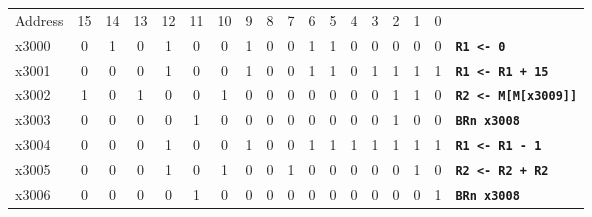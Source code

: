 \documentclass{patt}
\begin{document}
\setcounter{figure}{10}
\begin{figure}
\noindent\small
\hspace*{-8pc}\begin{minipage}{36pc}
\begin{center}
\renewcommand{\tabcolsep}{6pt}%
\begin{tabular}{@{}l c c c c c c c c c c c c c c c c l}
Address & 15 & 14 & 13 & \hfill{12} & 11 & 10 & 9 & 8 & 7 & 6 & 5 & 4 & 3  & 2 & 1 & 0 \\
\cline{2-17}
x3000 & \multicolumn{1}{|c}{0} & 1 & 0 & \multicolumn{1}{c|}{1} & 0 & 0 & \multicolumn{1}{c|}{1} & 0 & 0 & \multicolumn{1}{c|}{1} & \multicolumn{1}{c|}{1} & 0 & 0 & 0 & 0 & \multicolumn{1}{c|}{0} & \multicolumn{1}{l}{\tt\bfseries R1 <- 0}\\
\cline{2-17}
x3001 & \multicolumn{1}{|c}{0} & 0 & 0 & \multicolumn{1}{c|}{1} & 0 & 0 & \multicolumn{1}{c|}{1} & 0 & 0 & \multicolumn{1}{c|}{1} & \multicolumn{1}{c|}{1} & 0 & 1 & 1 & 1 & \multicolumn{1}{c|}{1} & \multicolumn{1}{l}{\tt\bfseries R1 <- R1 + 15}\\
\cline{2-17}
x3002 & \multicolumn{1}{|c}{1} & 0 & 1 & \multicolumn{1}{c|}{0} & 0 & 1 & \multicolumn{1}{c|}{0} & 0 & 0 & 0 & 0 & 0 & 0 & 1 & 1 & \multicolumn{1}{c|}{0} & \multicolumn{1}{l}{\tt\bfseries R2 <- M[M[x3009]]}\\
\cline{2-17}
x3003 & \multicolumn{1}{|c}{0} & 0 & 0 & \multicolumn{1}{c|}{0} & 1 & 0 & \multicolumn{1}{c|}{0} & 0 & 0 & 0 & 0 & 0 & 0 & 1 & 0 & \multicolumn{1}{c|}{0} & \multicolumn{1}{l}{\tt\bfseries BRn x3008}\\
\cline{2-17}
x3004 & \multicolumn{1}{|c}{0} & 0 & 0 & \multicolumn{1}{c|}{1} & 0 & 0 & \multicolumn{1}{c|}{1} & 0 & 0 & \multicolumn{1}{c|}{1} & \multicolumn{1}{c|}{1} & 1 & 1 & 1 & 1 & \multicolumn{1}{c|}{1} & \multicolumn{1}{l}{\tt\bfseries R1 <- R1 - 1}\\
\cline{2-17}
x3005 & \multicolumn{1}{|c}{0} & 0 & 0 & \multicolumn{1}{c|}{1} & 0 & 1 & \multicolumn{1}{c|}{0} & 0 & 1 & \multicolumn{1}{c|}{0} & \multicolumn{1}{c|}{0} & 0 & \multicolumn{1}{c|}{0} & 0 & 1 & \multicolumn{1}{c|}{0} & \multicolumn{1}{l}{\tt\bfseries R2 <- R2 + R2}\\
\cline{2-17}
x3006 & \multicolumn{1}{|c}{0} & 0 & 0 & \multicolumn{1}{c|}{0} & 1 & 0 & \multicolumn{1}{c|}{0} & 0 & 0 & 0 & 0 & 0 & 0 & 0 & 0 & \multicolumn{1}{c|}{1} & \multicolumn{1}{l}{\tt\bfseries BRn x3008}\\
\cline{2-17}

\end{tabular}
\end{center}
\end{minipage}
\end{figure}
\end{document}
